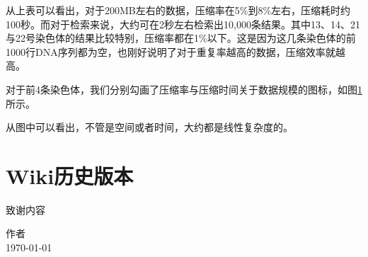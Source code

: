 ﻿\documentclass{sysuthesis}
\begin{document}
从上表可以看出，对于200MB左右的数据，压缩率在5\%到8\%左右，压缩耗时约100秒。而对于检索来说，大约可在2秒左右检索出10,000条结果。其中13、14、21与22号染色体的结果比较特别，压缩率都在1\%以下。这是因为这几条染色体的前1000行DNA序列都为空，也刚好说明了对于重复率越高的数据，压缩效率就越高。\par
对于前4条染色体，我们分别勾画了压缩率与压缩时间关于数据规模的图标，如图\ref{}所示。\par

从图中可以看出，不管是空间或者时间，大约都是线性复杂度的。


\section{Wiki历史版本}



\songti



\appendix

\begin{thankto}

	\songti{}
	致谢内容

	\vskip 18pt
	\begin{flushright}
		作者\\
		\today
	\end{flushright}
\end{thankto}

\backmatter
\end{document}
